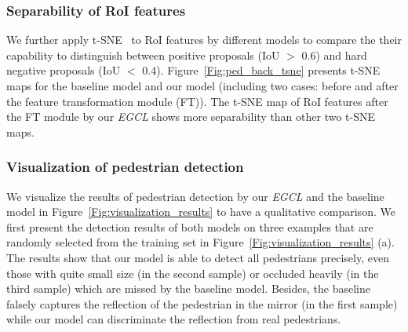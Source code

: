 \documentclass[journal]{IEEEtran}
\begin{document}
\subsubsection{Separability of RoI features} We further apply t-SNE~\cite{van2008visualizing} to RoI features by different models to compare the their capability to distinguish between positive proposals (IoU $>$ 0.6) and hard negative proposals (IoU $<$ 0.4). Figure~\ref{Fig:ped_back_tsne} presents t-SNE maps for the baseline model and our model (including two cases: before and after the feature transformation module (FT)). The t-SNE map of RoI features after the FT module by our \emph{EGCL} shows more separability than other two t-SNE maps.

\subsubsection{Visualization of pedestrian detection}
We visualize the results of pedestrian detection by our \emph{EGCL} and the baseline model in Figure~\ref{Fig:visualization_results} to have a qualitative comparison. We first present the detection results of both models on three examples that are randomly selected from the training set in Figure~\ref{Fig:visualization_results} (a). The results show that our model is able to detect all pedestrians precisely, even those with quite small size (in the second sample) or occluded heavily (in the third sample) which are missed by the baseline model. Besides, the baseline falsely captures the reflection of the pedestrian in the mirror (in the first sample) while our model can discriminate the reflection from real pedestrians.
\end{document}
